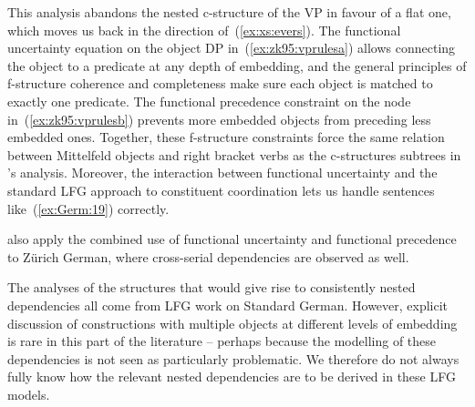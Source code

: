 \documentclass[output=paper,hidelinks]{langscibook}
\begin{document}
%
\begin{exe}
  \ex\label{ex:zk95:vprules}
  \begin{xlist}
    \ex\label{ex:zk95:vprulesa} 
    \ex\label{ex:zk95:vprulesb} 
  \end{xlist}
\end{exe}
%
This analysis abandons the nested c-structure of the VP in favour of a
flat one, which moves us back in the direction
of~(\ref{ex:xs:evers}). The functional uncertainty equation on the
object DP in~(\ref{ex:zk95:vprulesa}) allows connecting the object to a predicate at
any depth of \XCOMP embedding, and the general principles of f-structure
coherence and completeness make sure each object is matched to exactly
one predicate. The functional precedence constraint on the  node 
in~(\ref{ex:zk95:vprulesb}) prevents more embedded objects from preceding less
embedded ones. Together, these f-structure
constraints force the same relation between Mittelfeld objects and right bracket verbs as the
c-structures subtrees in \citeauthor{BKPZ:Dutch}'s analysis. Moreover,
the interaction between functional uncertainty and the standard LFG
approach to constituent coordination lets us handle sentences
like~(\ref{ex:Germ:19}) correctly.

\citet{zaenen-kaplan1995} also apply the
combined use of functional uncertainty and functional precedence to
Zürich German, where cross-serial dependencies are observed as well.

 The analyses of the structures that
would give rise to consistently nested dependencies all come from LFG
work on Standard German. However, explicit discussion of constructions
with multiple objects at different levels of embedding is rare in this
part of the literature -- perhaps because the modelling of these
dependencies is not seen as particularly problematic. We therefore do
not always fully know how the relevant nested dependencies are to
be derived in these LFG models.
\end{document}
